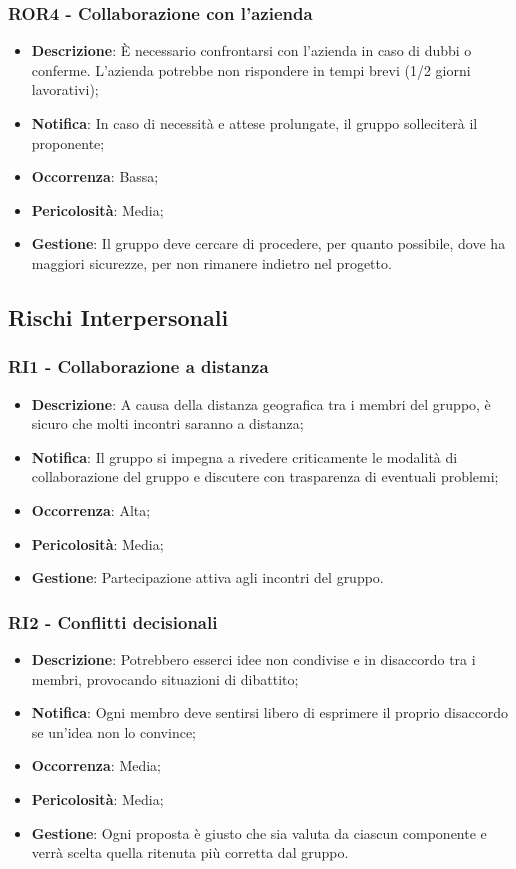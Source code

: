 	\subsubsection*{ROR4 - Collaborazione con l'azienda}
	\begin{itemize}
		\item \textbf{Descrizione}: È necessario confrontarsi con l'azienda in caso di dubbi o conferme. L'azienda potrebbe non rispondere in tempi brevi (1/2 giorni lavorativi);
		\item \textbf{Notifica}: In caso di necessità e attese prolungate, il gruppo solleciterà il proponente;
		\item \textbf{Occorrenza}: Bassa;
		\item \textbf{Pericolosità}: Media;
		\item \textbf{Gestione}: Il gruppo deve cercare di procedere, per quanto possibile, dove ha maggiori sicurezze, per non rimanere indietro nel progetto.
	\end{itemize}

   \subsection{Rischi Interpersonali}

	\subsubsection*{RI1 - Collaborazione a distanza}
	\begin{itemize}
		\item \textbf{Descrizione}: A causa della distanza geografica tra i membri del gruppo, è sicuro che molti incontri saranno a distanza;
		\item \textbf{Notifica}: Il gruppo si impegna a rivedere criticamente le modalità di collaborazione del gruppo e discutere con trasparenza di eventuali problemi;
		\item \textbf{Occorrenza}: Alta;
		\item \textbf{Pericolosità}: Media;
		\item \textbf{Gestione}: Partecipazione attiva agli incontri del gruppo.
	\end{itemize}

	\subsubsection*{RI2 - Conflitti decisionali}
	\begin{itemize}
		\item \textbf{Descrizione}: Potrebbero esserci idee non condivise e in disaccordo tra i membri, provocando situazioni di dibattito;
		\item \textbf{Notifica}: Ogni membro deve sentirsi libero di esprimere il proprio disaccordo se un'idea non lo convince;
		\item \textbf{Occorrenza}: Media;
		\item \textbf{Pericolosità}: Media;
		\item \textbf{Gestione}: Ogni proposta è giusto che sia valuta da ciascun componente e verrà scelta quella ritenuta più corretta dal gruppo.
	\end{itemize}

